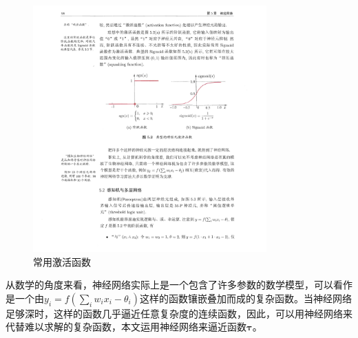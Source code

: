 \begin{figure}[htbp]
	\begin{center}
		\includegraphics[width=0.8\textwidth]{figures//3.pdf}
		\caption{常用激活函数}
		\label{fig:5-4}
	\end{center}
\end{figure}
\par 从数学的角度来看，神经网络实际上是一个包含了许多参数的数学模型，可以看作是一个由$y_i = f(\sum_i w_ix_i-\theta_i)$这样的函数镶嵌叠加而成的复杂函数。当神经网络足够深时，这样的函数几乎逼近任意复杂度的连续函数，因此，可以用神经网络来代替难以求解的复杂函数，本文运用神经网络来逼近函数$\boldsymbol{\tau}$。
